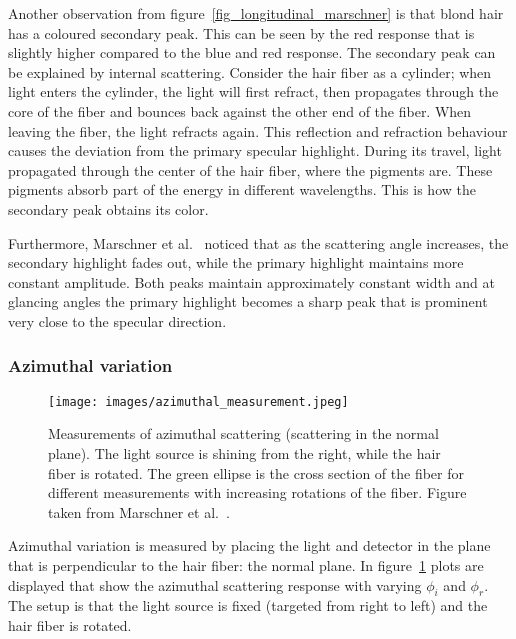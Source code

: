 \documentclass[11pt,a4paper]{report}
\begin{document}
Another observation from figure~\ref{fig_longitudinal_marschner} is that blond hair has a coloured secondary peak. This can be seen by the red response that is slightly higher compared to the blue and red response. The secondary peak can be explained by internal scattering. Consider the hair fiber as a cylinder; when light enters the cylinder, the light will first refract, then propagates through the core of the fiber and bounces back against the other end of the fiber. When leaving the fiber, the light refracts again. This reflection and refraction behaviour causes the deviation from the primary specular highlight. During its travel, light propagated through the center of the hair fiber, where the pigments are. These pigments absorb part of the energy in different wavelengths. This is how the secondary peak obtains its color.

Furthermore, Marschner et al.~\cite{marschner} noticed that as the scattering angle increases, the secondary highlight fades out, while the primary highlight maintains more constant amplitude. Both peaks maintain approximately constant width and at glancing angles the primary highlight becomes a sharp peak that is prominent very close to the specular direction. 


\subsubsection{Azimuthal variation}


\begin{figure}[h]
\begin{center}
\texttt{[image: images/azimuthal\_measurement.jpeg]}
\caption{Measurements of azimuthal scattering (scattering in the normal plane). The light source is shining from the right, while the hair fiber is rotated. The green ellipse is the cross section of the fiber for different measurements with increasing rotations of the fiber. Figure taken from Marschner et al.~\cite{marschner}.}
\label{fig_azimuthal_marschner}
\end{center}
\end{figure}


Azimuthal variation is measured by placing the light and detector in the plane that is perpendicular to the hair fiber: the normal plane. In figure~\ref{fig_azimuthal_marschner} plots are displayed that show the azimuthal scattering response with varying $\phi_i$ and $\phi_r$. The setup is that the light source is fixed (targeted from right to left) and the hair fiber is rotated. 
\end{document}
